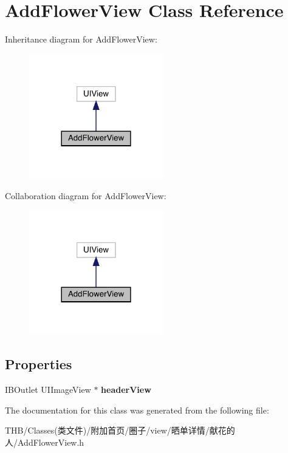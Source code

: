\hypertarget{interface_add_flower_view}{}\section{Add\+Flower\+View Class Reference}
\label{interface_add_flower_view}


Inheritance diagram for Add\+Flower\+View\+:\nopagebreak
\begin{figure}[H]
\begin{center}
\leavevmode
\includegraphics[width=165pt]{interface_add_flower_view__inherit__graph}
\end{center}
\end{figure}


Collaboration diagram for Add\+Flower\+View\+:\nopagebreak
\begin{figure}[H]
\begin{center}
\leavevmode
\includegraphics[width=165pt]{interface_add_flower_view__coll__graph}
\end{center}
\end{figure}
\subsection*{Properties}
\begin{DoxyCompactItemize}
\item 
\mbox{\label{interface_add_flower_view_aa48adc757f5c0d26a5d618e47ae9e5d0}} 
I\+B\+Outlet U\+I\+Image\+View $\ast$ {\bfseries header\+View}
\end{DoxyCompactItemize}


The documentation for this class was generated from the following file\+:\begin{DoxyCompactItemize}
\item 
T\+H\+B/\+Classes(类文件)/附加首页/圈子/view/晒单详情/献花的人/Add\+Flower\+View.\+h\end{DoxyCompactItemize}
